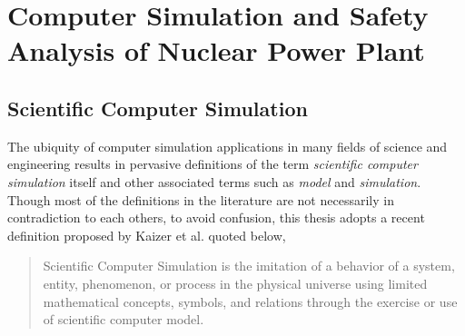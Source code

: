 \newpage
\section{Computer Simulation and Safety Analysis of Nuclear Power Plant}\label{sec:intro_computer_simulation}

\subsection{Scientific Computer Simulation}\label{sub:intro_scientific_computer_simulation}

The ubiquity of computer simulation applications in many fields of science and engineering results in pervasive definitions of the term \textit{scientific computer simulation} itself and other associated terms such as \textit{model} and \textit{simulation}.
Though most of the definitions in the literature are not necessarily in contradiction to each others, 
to avoid confusion, this thesis adopts a recent definition proposed by Kaizer et al.\cite{Kaizer2015} quoted below,
\begin{quote}
	Scientific Computer Simulation is the imitation of a behavior of a system, entity, phenomenon, or process in the physical universe 
	using limited mathematical concepts, symbols, and relations through the exercise or use of scientific computer model.
\end{quote}

